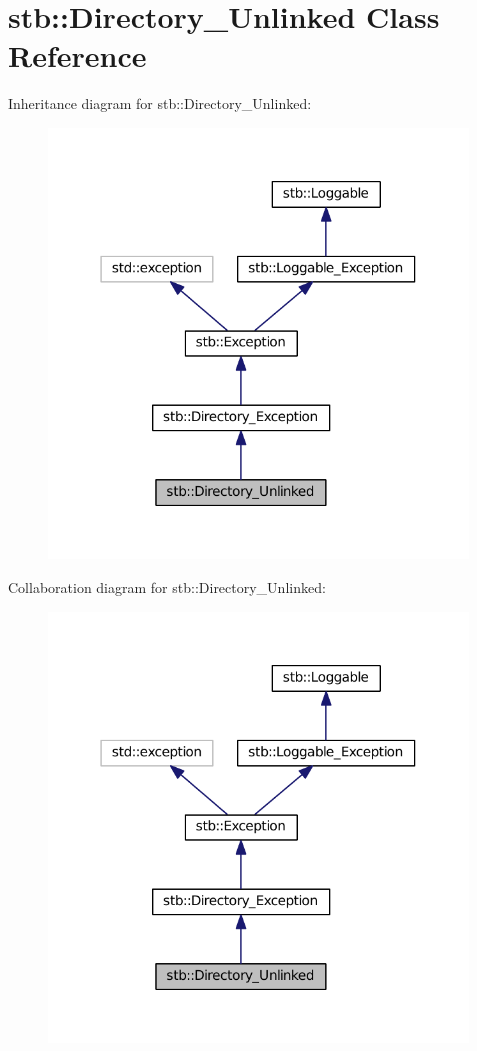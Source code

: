 \hypertarget{classstb_1_1Directory__Unlinked}{\section{stb\+:\+:Directory\+\_\+\+Unlinked Class Reference}
\label{classstb_1_1Directory__Unlinked}
}


Inheritance diagram for stb\+:\+:Directory\+\_\+\+Unlinked\+:
\nopagebreak
\begin{figure}[H]
\begin{center}
\leavevmode
\includegraphics[width=316pt]{classstb_1_1Directory__Unlinked__inherit__graph}
\end{center}
\end{figure}


Collaboration diagram for stb\+:\+:Directory\+\_\+\+Unlinked\+:
\nopagebreak
\begin{figure}[H]
\begin{center}
\leavevmode
\includegraphics[width=316pt]{classstb_1_1Directory__Unlinked__coll__graph}
\end{center}
\end{figure}

